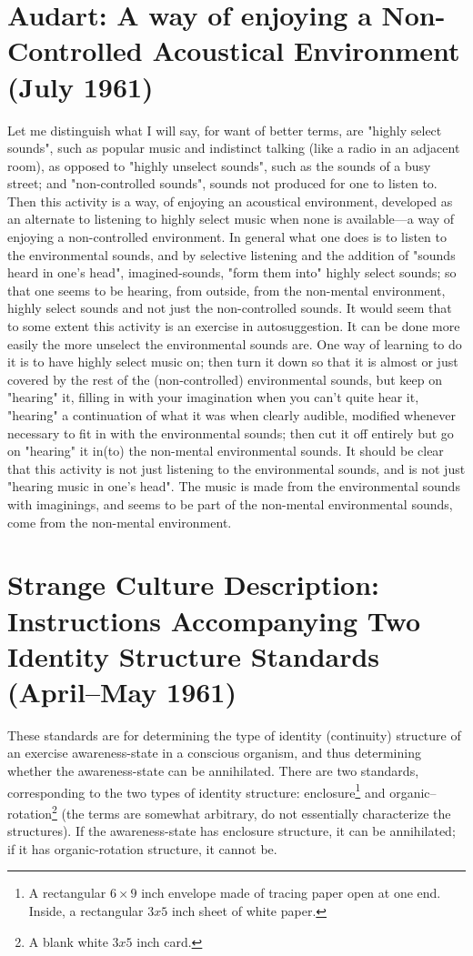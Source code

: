 \section{Audart: A way of enjoying a Non-Controlled Acoustical Environment (July 1961)}
Let me distinguish what I will say, for want of better
terms, are "highly select sounds", such as popular music and 
indistinct talking (like a radio in an adjacent room), as 
opposed to "highly unselect sounds", such as the sounds of a
busy street; and "non-controlled sounds", sounds not produced
for one to listen to. Then this activity is a way, of enjoying
an acoustical environment, developed as an alternate to
listening to highly select music when none is available---a
way of enjoying a non-controlled environment. In general what
one does is to listen to the environmental sounds, and by
selective listening and the addition of "sounds heard in one's
head", imagined-sounds, "form them into" highly select sounds;
so that one seems to be hearing, from outside, from the non-mental
environment, highly select sounds and not just the non-controlled
sounds. It would seem that to some extent this 
activity is an exercise in autosuggestion. It can be done more
easily the more unselect the environmental sounds are. One way 
of learning to do it is to have highly select music on; then 
turn it down so that it is almost or just covered by the rest
of the (non-controlled) environmental sounds, but keep on 
"hearing" it, filling in with your imagination when you can't
quite hear it, "hearing" a continuation of what it was when 
clearly audible, modified whenever necessary to fit in with 
the environmental sounds; then cut it off entirely but go on 
"hearing" it in(to) the non-mental environmental sounds. It 
should be clear that this activity is not just listening to the
environmental sounds, and is not just "hearing music in one's 
head". The music is made from the environmental sounds with
imaginings, and seems to be part of the non-mental environmental
sounds, come from the non-mental environment. 

\clearpage
\section{Strange Culture Description: Instructions Accompanying Two Identity Structure Standards (April--May 1961)}

These standards are for determining the type of identity 
(continuity) structure of an exercise awareness-state in a
conscious organism, and thus determining whether the awareness-state
can be annihilated. There are two standards, corresponding
to the two types of identity structure: enclosure\footnote{A rectangular $6\times9$ inch envelope made of tracing paper open at one end. Inside, a rectangular $3x5$ inch sheet of white paper.} and 
organic--rotation\footnote{A blank white $3x5$ inch card.} (the terms are somewhat arbitrary, do not
essentially characterize the structures). If the awareness-state
has enclosure structure, it can be annihilated; if it 
has organic-rotation structure, it cannot be. 

